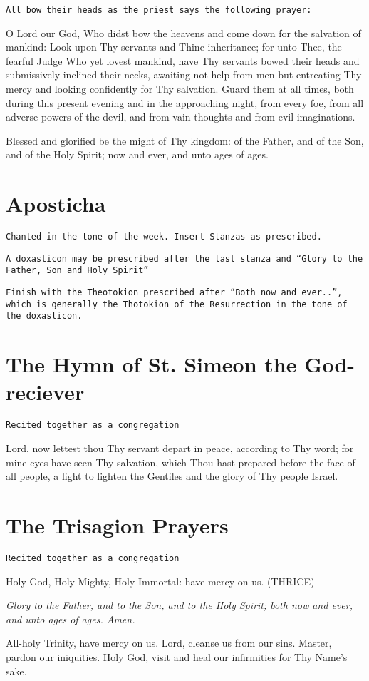 \documentclass[twoside, letterpaper, 12pt]{report}
\newcommand{\instruction}[1]{%
  \texttt{\scriptsize{#1}}%
}
\newcommand{\centeredsection}[1]{%
  \needspace{10\baselineskip}%
  \section*{\centering{}#1}%
}
\begin{document}
\instruction{All bow their heads as the priest says the following prayer:}
\begin{priest}
\item O Lord our God, Who didst bow the heavens and come down for the salvation of
    mankind: Look upon Thy servants and Thine inheritance; for unto Thee, the fearful
    Judge Who yet lovest mankind, have Thy servants bowed their heads and
    submissively inclined their necks, awaiting not help from men but entreating Thy
    mercy and looking confidently for Thy salvation. Guard them at all times, both
    during this present evening and in the approaching night, from every foe, from all
    adverse powers of the devil, and from vain thoughts and from evil imaginations.
\item Blessed and glorified be the might of Thy kingdom: of the Father, and of the Son,
    and of the Holy Spirit; now and ever, and unto ages of ages.
\end{priest}


\centeredsection{Aposticha}
\instruction{Chanted in the tone of the week. Insert Stanzas as prescribed.}

\vbox{}
\instruction{A doxasticon may be prescribed after the last stanza and
``Glory to the Father, Son and Holy Spirit''}

\vbox{}
\instruction{Finish with the Theotokion prescribed after ``Both now and ever..'',
which is generally the Thotokion of the Resurrection in the tone of the doxasticon.
}

\cleardoublepage

\centeredsection{The Hymn of St. Simeon the God-reciever}
\instruction{Recited together as a congregation}

Lord, now lettest thou Thy servant depart in peace, according to Thy word; for mine eyes
have seen Thy salvation, which Thou hast prepared before the face of all people, a light to lighten
the Gentiles and the glory of Thy people Israel.

\centeredsection{The Trisagion Prayers}
\instruction{Recited together as a congregation}

Holy God, Holy Mighty, Holy Immortal: have mercy on us. (THRICE)

\vbox{}
\emph{Glory to the Father, and to the Son, and to the Holy Spirit; both now and ever, and
unto ages of ages. Amen.}

\vbox{}
All-holy Trinity, have mercy on us. Lord, cleanse us from our sins. Master, pardon
our iniquities. Holy God, visit and heal our infirmities for Thy Name’s sake.
\end{document}
